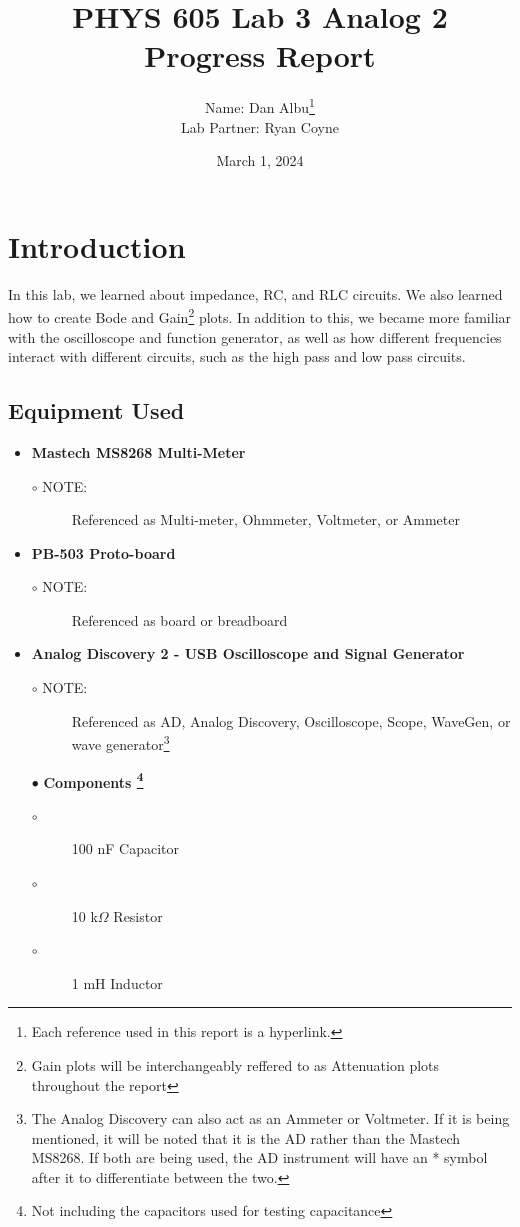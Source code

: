 \documentclass{article}
\title{PHYS 605 Lab 3 Analog 2 Progress Report}
\author{Name: Dan Albu\thanks{Each reference used in this report is a hyperlink.} \\Lab Partner: Ryan Coyne}
\date{March 1, 2024}
\begin{document}
\maketitle
\section{Introduction}
In this lab, we learned about impedance, RC, and RLC circuits. We also learned how to create Bode and Gain\footnote{Gain plots will be interchangeably reffered to as Attenuation plots throughout the report} plots. In addition to this, we became more familiar with the oscilloscope and function generator, as well as how different frequencies interact with different circuits, such as the high pass and low pass circuits.

\subsection{Equipment Used}
\begin{itemize}[label=--]
    \item \textbf{Mastech MS8268 Multi-Meter}
        \begin{description}
            \item[$\circ$ NOTE:]Referenced as Multi-meter, Ohmmeter, Voltmeter, or Ammeter
        \end{description}
    \item \textbf{PB-503 Proto-board}
        \begin{description}
            \item[$\circ$ NOTE:]Referenced as board or breadboard
        \end{description}
    \item \textbf{Analog Discovery 2 - USB Oscilloscope and Signal Generator}
        \begin{description}
            \item[$\circ$ NOTE:]Referenced as AD, Analog Discovery, Oscilloscope, Scope, WaveGen, or wave generator\footnote{ The Analog Discovery can also act as an Ammeter or Voltmeter. If it is being mentioned, it will be noted that it is the AD rather than the Mastech MS8268. If both are being used, the AD instrument will have an * symbol after it to differentiate between the two.}
        \end{description}
    \item[] \vspace{10mm}
    \item[$\bullet$] \textbf{Components \footnote{Not including the capacitors used for testing capacitance}}
        \begin{description}
            \item[$\circ$] 100 nF Capacitor
            \item[$\circ$] 10 k$\Omega$ Resistor
            \item[$\circ$] 1 mH Inductor
        \end{description}
\end{itemize}
\end{document}
